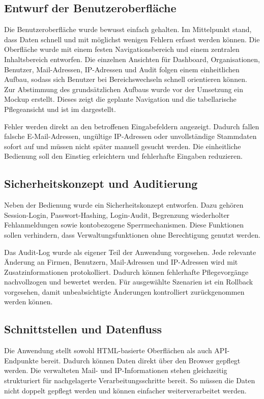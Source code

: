 \subsection{Entwurf der Benutzeroberfläche}
\label{sec:EntwurfBenutzeroberflaeche}
Die Benutzeroberfläche wurde bewusst einfach gehalten. Im Mittelpunkt stand,
dass Daten schnell und mit möglichst wenigen Fehlern erfasst werden können.
Die Oberfläche wurde mit einem festen Navigationsbereich und einem zentralen
Inhaltsbereich entworfen. Die einzelnen Ansichten für Dashboard, Organisationen,
Benutzer, Mail-Adressen, IP-Adressen und Audit folgen einem einheitlichen
Aufbau, sodass sich Benutzer bei Bereichswechseln schnell orientieren können.
Zur Abstimmung des grundsätzlichen Aufbaus wurde vor der
Umsetzung ein Mockup erstellt. Dieses zeigt die geplante Navigation und die
tabellarische Pflegeansicht und ist im  dargestellt.

Fehler werden direkt an den betroffenen Eingabefeldern angezeigt. Dadurch
fallen falsche E-Mail-Adressen, ungültige IP-Adressen oder unvollständige
Stammdaten sofort auf und müssen nicht später manuell gesucht werden. Die
einheitliche Bedienung soll den Einstieg erleichtern und fehlerhafte Eingaben
reduzieren.

\subsection{Sicherheitskonzept und Auditierung}
\label{sec:Sicherheitskonzept}
Neben der Bedienung wurde ein Sicherheitskonzept entworfen. Dazu
gehören Session-Login, Passwort-Hashing, Login-Audit, Begrenzung wiederholter
Fehlanmeldungen sowie kontobezogene Sperrmechanismen. Diese Funktionen sollen
verhindern, dass Verwaltungsfunktionen ohne Berechtigung genutzt werden.

Das Audit-Log wurde als eigener Teil der Anwendung vorgesehen. Jede relevante
Änderung an Firmen, Benutzern, Mail-Adressen und IP-Adressen wird mit
Zusatzinformationen protokolliert. Dadurch können fehlerhafte Pflegevorgänge
nachvollzogen und bewertet werden. Für ausgewählte Szenarien ist ein Rollback
vorgesehen, damit unbeabsichtigte Änderungen kontrolliert
zurückgenommen werden können.

\subsection{Schnittstellen und Datenfluss}
\label{sec:SchnittstellenUndDatenfluss}
Die Anwendung stellt sowohl HTML-basierte Oberflächen als auch API-Endpunkte
bereit. Dadurch können Daten direkt über den Browser gepflegt werden. Die
verwalteten Mail- und IP-Informationen stehen gleichzeitig strukturiert für
nachgelagerte Verarbeitungsschritte bereit. So müssen die Daten nicht doppelt
gepflegt werden und können einfacher weiterverarbeitet werden.

